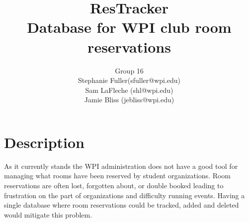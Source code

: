 \documentclass{article}
\title{ResTracker \\ Database for WPI club room reservations}
\author{Group 16 \\ Stephanie Fuller(sfuller@wpi.edu) \\ Sam LaFleche
(shl@wpi.edu) \\ Jamie Bliss (jebliss@wpi.edu)}
\begin{document}
\maketitle

\section{Description}
As it currently stands the WPI administration does not have a good tool for
managing what rooms have been reserved by student organizations. Room
reservations are often lost, forgotten about, or double booked leading to
frustration on the part of organizations and difficulty running events. Having a
single database where room reservations could be tracked, added and deleted
would mitigate this problem.

\end{document}
